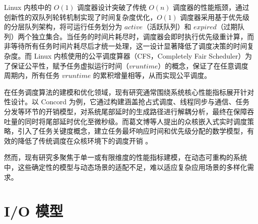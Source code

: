 Linux 内核中的 $O(1)$ 调度器设计突破了传统 $O(n)$ 调度器的性能瓶颈，通过创新性的双队列轮转机制实现了时间复杂度优化，$O(1)$ 调度器采用基于优先级的分层队列架构，将可运行任务划分为 $active$（活跃队列）和 $expired$（过期队列）两个独立集合。当任务的时间片耗尽时，调度器会即时执行优先级重计算，而非等待所有任务时间片耗尽后才统一处理，这一设计显著降低了调度决策的时间复杂度。而 Linux 内核使用的公平调度算器（CFS，Completely Fair Scheduler）为了保证公平性，赋予任务虚拟运行时间（$vruntime$）的概念，保证了在任意调度周期内，所有任务 $vruntime$ 的累积增量相等，从而实现公平调度。

在任务调度算法的建模和优化领域，现有研究通常围绕系统核心性能指标展开针对性设计。以 Concord \cite{iyer2023achieving}为例，它通过构建涵盖抢占式调度、线程同步与通信、任务分发等环节的开销模型，对系统尾部延时的生成路径进行解耦分析，最终在保障吞吐量的同时将尾部延时优化至微秒级。而葛文博等人提出的众核嵌入式实时调度策略，引入了任务关键度概念，建立任务最坏响应时间和优先级分配的数学模型，有效的降低了传统调度在众核环境下的调度开销 \cite{gewenbo2023}。

然而，现有研究多聚焦于单一或有限维度的性能指标建模，在动态可重构的系统中，这些确定性的模型与动态场景的适配不足，难以适应复杂应用场景的多样化需求。

\section{I/O 模型}


